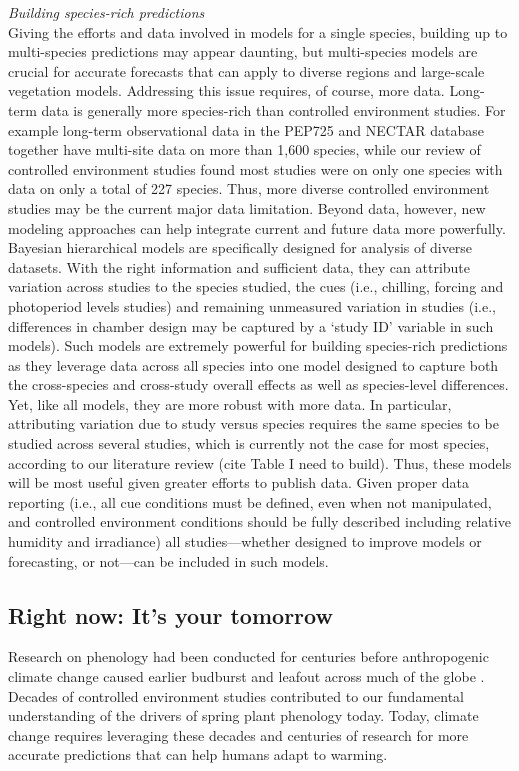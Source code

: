 \documentclass[11pt,letter]{article}
\begin{document}
\emph{Building species-rich predictions}\\
Giving the efforts and data involved in models for a single species, building up to multi-species predictions may appear daunting, but multi-species models are crucial for accurate forecasts that can apply to diverse regions and large-scale vegetation models. Addressing this issue requires, of course, more data. Long-term data is generally more species-rich than controlled environment studies. For example long-term observational data in the PEP725 and NECTAR database together have multi-site data on more than 1,600 species, while our review of controlled environment studies found most studies were on only one species with data on only a total of 227 species. Thus, more diverse controlled environment studies may be the current major data limitation. Beyond data, however, new modeling approaches can help integrate current and future data more powerfully. \\

Bayesian hierarchical models are specifically designed for analysis of diverse datasets. With the right information and sufficient data, they can attribute variation across studies to the species studied, the cues (i.e., chilling, forcing and photoperiod levels studies) and remaining unmeasured variation in studies (i.e., differences in chamber design may be captured by a `study ID' variable in such models). Such models are extremely powerful for building species-rich predictions as they leverage data across all species into one model designed to capture both the cross-species and cross-study overall effects as well as species-level differences. Yet, like all models, they are more robust with more data. In particular, attributing variation due to study versus species requires the same species to be studied across several studies, which is currently not the case for most species, according to our literature review (cite Table I need to build). Thus, these models will be most useful given greater efforts to publish data. Given proper data reporting (i.e., all cue conditions must be defined, even when not manipulated, and controlled environment conditions should be fully described including relative humidity and irradiance) all studies---whether designed to improve models or forecasting, or not---can be included in such models. 

\subsection{Right now: It's your tomorrow}
Research on phenology had been conducted for centuries before anthropogenic climate change caused earlier budburst and leafout across much of the globe \citep{Sparks:1995mv}. Decades of controlled environment studies contributed to our fundamental understanding of the drivers of spring plant phenology today. Today, climate change requires leveraging these decades and centuries of research for more accurate predictions that can help humans adapt to warming. \\
\end{document}
